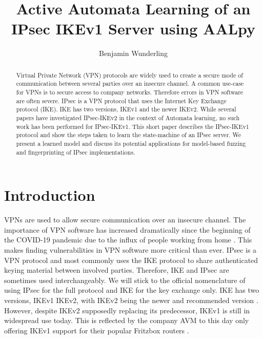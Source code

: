 \documentclass[runningheads]{llncs}
\begin{document}
%
\title{Active Automata Learning of an IPsec IKEv1 Server using AALpy}
%
%
\author{Benjamin Wunderling}

%
%
%
\maketitle              %
%
\begin{abstract}
Virtual Private Network (VPN) protocols are widely used to create a secure mode of communication between several parties over an insecure channel. A common use-case for VPNs is to secure access to company networks. Therefore errors in VPN software are often severe. IPsec is a VPN protocol that uses the Internet Key Exchange protocol (IKE). IKE has two versions, IKEv1 and the newer IKEv2. While several papers have investigated IPsec-IKEv2 in the context of Automata learning, no such work has been performed for IPsec-IKEv1. This short paper describes the IPsec-IKEv1 protocol and show the steps taken to learn the state-machine of an IPsec server. We present a learned model and discuss its potential applications for model-based fuzzing and fingerprinting of IPsec implementations.

\end{abstract}
%
%
%
\section{Introduction}
VPNs are used to allow secure communication over an insecure channel. The importance of VPN software has increased dramatically since the beginning of the COVID-19 pandemic due to the influx of people working from home \cite{abhijith2020impact}. This makes finding vulnerabilities in VPN software more critical than ever. IPsec is a VPN protocol and most commonly uses the IKE protocol to share authenticated keying material between involved parties. Therefore, IKE and IPsec are sometimes used interchangeably. We will stick to the official nomenclature of using IPsec for the full protocol and IKE for the key exchange only. IKE has two versions, IKEv1 IKEv2, with IKEv2 being the newer and recommended version \cite{nist791491}. However, despite IKEv2 supposedly replacing its predecessor, IKEv1 is still in widespread use today. This is reflected by the company AVM to this day only offering IKEv1 support for their popular Fritzbox routers \cite{avm2022}.
\end{document}
